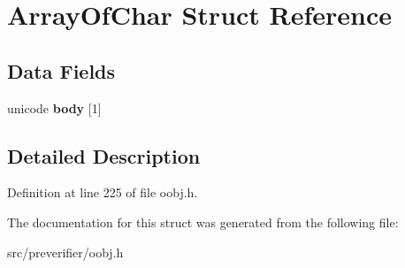 \section{ArrayOfChar Struct Reference}
\label{struct_array_of_char}
\subsection*{Data Fields}
\begin{DoxyCompactItemize}
\item 
unicode {\bfseries body} [1]\label{struct_array_of_char_a9f73491fe766fbef9178232acbe2f3be}

\end{DoxyCompactItemize}


\subsection{Detailed Description}


Definition at line 225 of file oobj.h.



The documentation for this struct was generated from the following file:\begin{DoxyCompactItemize}
\item 
src/preverifier/oobj.h\end{DoxyCompactItemize}
